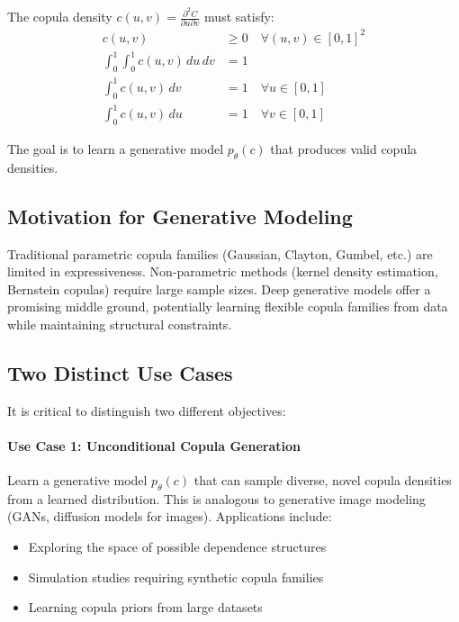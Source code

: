 \documentclass[11pt]{article}
\begin{document}
The copula density $c(u,v) = \frac{\partial^2 C}{\partial u \partial v}$ must satisfy:
\begin{align}
c(u,v) &\geq 0 \quad \forall (u,v) \in [0,1]^2 \label{eq:positivity} \\
\int_0^1 \int_0^1 c(u,v) \, du \, dv &= 1 \label{eq:normalization} \\
\int_0^1 c(u,v) \, dv &= 1 \quad \forall u \in [0,1] \label{eq:uniform_u} \\
\int_0^1 c(u,v) \, du &= 1 \quad \forall v \in [0,1] \label{eq:uniform_v}
\end{align}

The goal is to learn a generative model $p_\theta(c)$ that produces valid copula densities.

\subsection{Motivation for Generative Modeling}

Traditional parametric copula families (Gaussian, Clayton, Gumbel, etc.) are limited in expressiveness. Non-parametric methods (kernel density estimation, Bernstein copulas) require large sample sizes. Deep generative models offer a promising middle ground, potentially learning flexible copula families from data while maintaining structural constraints.

\subsection{Two Distinct Use Cases}

It is critical to distinguish two different objectives:

\paragraph{Use Case 1: Unconditional Copula Generation}
Learn a generative model $p_\theta(c)$ that can sample diverse, novel copula densities from a learned distribution. This is analogous to generative image modeling (GANs, diffusion models for images). Applications include:
\begin{itemize}
    \item Exploring the space of possible dependence structures
    \item Simulation studies requiring synthetic copula families
    \item Learning copula priors from large datasets
\end{itemize}
\end{document}
